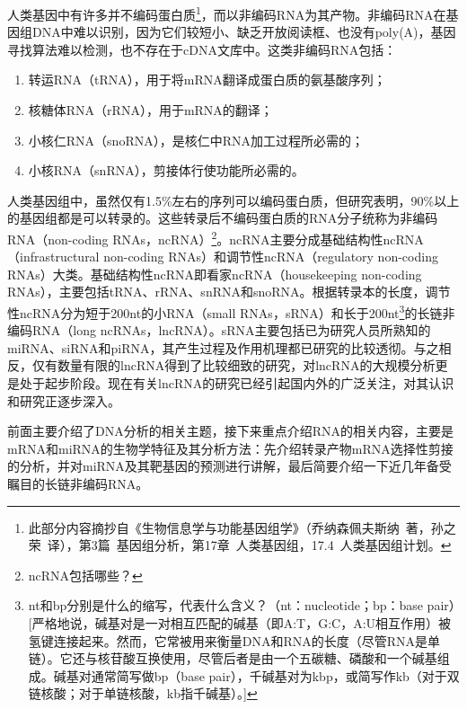 \documentclass[11pt,a4paper,twoside]{book}
\begin{document}
人类基因中有许多并不编码蛋白质\footnote{此部分内容摘抄自《生物信息学与功能基因组学》（乔纳森\textbullet 佩夫斯纳\ 著，孙之荣\ 译），第3篇\ 基因组分析，第17章\ 人类基因组，17.4\ 人类基因组计划。}，而以非编码RNA为其产物。非编码RNA在基因组DNA中难以识别，因为它们较短小、缺乏开放阅读框、也没有poly(A)，基因寻找算法难以检测，也不存在于cDNA文库中。这类非编码RNA包括：
\begin{enumerate}
  \item 转运RNA（tRNA），用于将mRNA翻译成蛋白质的氨基酸序列；
  \item 核糖体RNA（rRNA），用于mRNA的翻译；
  \item 小核仁RNA（snoRNA），是核仁中RNA加工过程所必需的；
  \item 小核RNA（snRNA），剪接体行使功能所必需的。
\end{enumerate}

人类基因组中，虽然仅有1.5\%左右的序列可以编码蛋白质，但研究表明，90\%以上的基因组都是可以转录的。这些转录后不编码蛋白质的RNA分子统称为非编码RNA（non-coding RNAs，ncRNA）\footnote{ncRNA包括哪些？}。ncRNA主要分成基础结构性ncRNA（infrastructural non-coding RNAs）和调节性ncRNA（regulatory non-coding RNAs）大类。基础结构性ncRNA即看家ncRNA（housekeeping non-coding RNAs），主要包括tRNA、rRNA、snRNA和snoRNA。根据转录本的长度，调节性ncRNA分为短于200nt的小RNA（small RNAs，sRNA）和长于200nt\footnote{nt和bp分别是什么的缩写，代表什么含义？（nt：nucleotide；bp：base pair）[严格地说，碱基对是一对相互匹配的碱基（即A:T，G:C，A:U相互作用）被氢键连接起来。然而，它常被用来衡量DNA和RNA的长度（尽管RNA是单链）。它还与核苷酸互换使用，尽管后者是由一个五碳糖、磷酸和一个碱基组成。碱基对通常简写做bp（base pair），千碱基对为kbp，或简写作kb（对于双链核酸；对于单链核酸，kb指千碱基）。]}的长链非编码RNA（long ncRNAs，lncRNA）。sRNA主要包括已为研究人员所熟知的miRNA、siRNA和piRNA，其产生过程及作用机理都已研究的比较透彻。与之相反，仅有数量有限的lncRNA得到了比较细致的研究，对lncRNA的大规模分析更是处于起步阶段。现在有关lncRNA的研究已经引起国内外的广泛关注，对其认识和研究正逐步深入。

前面主要介绍了DNA分析的相关主题，接下来重点介绍RNA的相关内容，主要是mRNA和miRNA的生物学特征及其分析方法：先介绍转录产物mRNA选择性剪接的分析，并对miRNA及其靶基因的预测进行讲解，最后简要介绍一下近几年备受瞩目的长链非编码RNA。
\end{document}
